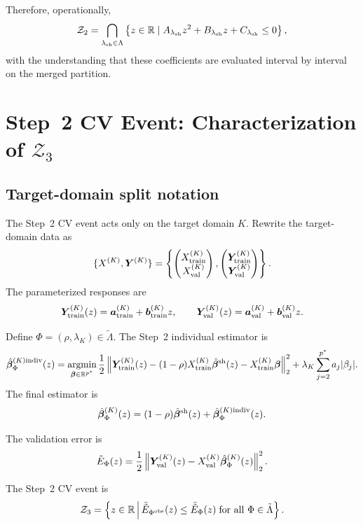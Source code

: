 \documentclass[11pt]{article}
\begin{document}
Therefore, operationally,
\[
\mathcal{Z}_2 = \bigcap_{\lambda_{\rm sh} \in \Lambda}
\left\{ z \in \mathbb{R} \mid A_{\lambda_{\rm sh}} z^2 + B_{\lambda_{\rm sh}} z + C_{\lambda_{\rm sh}} \le 0 \right\},
\]
with the understanding that these coefficients are evaluated interval by interval on the merged partition.

\section{Step~2 CV Event: Characterization of $\mathcal{Z}_3$}

\subsection{Target-domain split notation}
The Step~2 CV event acts only on the target domain $K$. Rewrite the target-domain data as
\[
\{X^{(K)}, \bm{Y}^{(K)}\}
=
\left\{
\begin{pmatrix} X^{(K)}_{\rm train} \\ X^{(K)}_{\rm val} \end{pmatrix},
\begin{pmatrix} \bm{Y}^{(K)}_{\rm train} \\ \bm{Y}^{(K)}_{\rm val} \end{pmatrix}
\right\}.
\]
The parameterized responses are
\[
\bm{Y}^{(K)}_{\rm train}(z) = \bm{a}^{(K)}_{\rm train} + \bm{b}^{(K)}_{\rm train} z,
\qquad
\bm{Y}^{(K)}_{\rm val}(z) = \bm{a}^{(K)}_{\rm val} + \bm{b}^{(K)}_{\rm val} z.
\]

Define $\Phi = (\rho, \lambda_K) \in \tilde{\Lambda}$. The Step~2 individual estimator is
\[
\hat{\bm\beta}_{\Phi}^{(K){\rm indiv}}(z)
=
\operatorname*{argmin}_{\bm\beta \in \mathbb{R}^{p^*}}
\frac{1}{2}
\left\|
\bm{Y}_{\rm train}^{(K)}(z)
-
(1-\rho)X_{\rm train}^{(K)}\hat{\bm\beta}^{\rm sh}(z)
-
X_{\rm train}^{(K)}\bm\beta
\right\|_2^2
+
\lambda_K \sum_{j=2}^{p^*} a_j |\beta_j|.
\]
The final estimator is
\[
\hat{\bm\beta}_{\Phi}^{(K)}(z)
=
(1-\rho)\hat{\bm\beta}^{\rm sh}(z) + \hat{\bm\beta}_{\Phi}^{(K){\rm indiv}}(z).
\]

The validation error is
\[
\tilde{E}_{\Phi}(z)
=
\frac{1}{2}
\left\| \bm{Y}^{(K)}_{\rm val}(z) - X^{(K)}_{\rm val}\hat{\bm\beta}_{\Phi}^{(K)}(z) \right\|_2^2.
\]

The Step~2 CV event is
\[
\mathcal{Z}_3
=
\left\{ z \in \mathbb{R} \, \middle| \,
\bar{\tilde{E}}_{\Phi^{\rm obs}}(z) \le \bar{\tilde{E}}_{\Phi}(z)
\;\text{for all } \Phi \in \tilde{\Lambda}
\right\}.
\]
\end{document}
